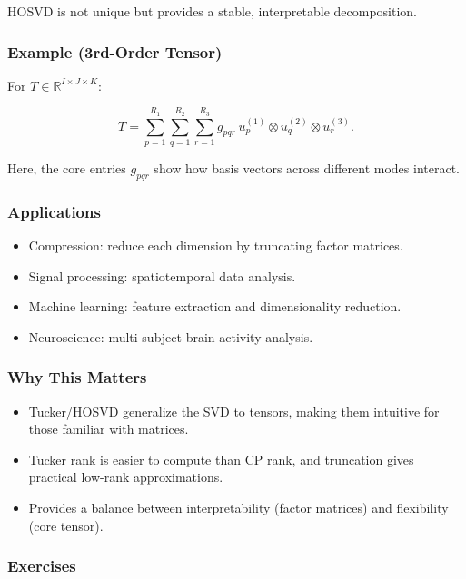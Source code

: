 \documentclass[
  letterpaper,
  DIV=11,
  numbers=noendperiod]{scrreprt}
\providecommand{\tightlist}{%
  \setlength{\itemsep}{0pt}\setlength{\parskip}{0pt}}
\begin{document}
HOSVD is not unique but provides a stable, interpretable decomposition.

\subsubsection{Example (3rd-Order
Tensor)}\label{example-3rd-order-tensor-3}

For \(T \in \mathbb{R}^{I \times J \times K}\):

\[
T = \sum_{p=1}^{R_1}\sum_{q=1}^{R_2}\sum_{r=1}^{R_3} g_{pqr}\, u^{(1)}_p \otimes u^{(2)}_q \otimes u^{(3)}_r.
\]

Here, the core entries \(g_{pqr}\) show how basis vectors across
different modes interact.

\subsubsection{Applications}\label{applications-3}

\begin{itemize}
\tightlist
\item
  Compression: reduce each dimension by truncating factor matrices.
\item
  Signal processing: spatiotemporal data analysis.
\item
  Machine learning: feature extraction and dimensionality reduction.
\item
  Neuroscience: multi-subject brain activity analysis.
\end{itemize}

\subsubsection{Why This Matters}\label{why-this-matters-36}

\begin{itemize}
\tightlist
\item
  Tucker/HOSVD generalize the SVD to tensors, making them intuitive for
  those familiar with matrices.
\item
  Tucker rank is easier to compute than CP rank, and truncation gives
  practical low-rank approximations.
\item
  Provides a balance between interpretability (factor matrices) and
  flexibility (core tensor).
\end{itemize}

\subsubsection{Exercises}\label{exercises-50}
\end{document}
